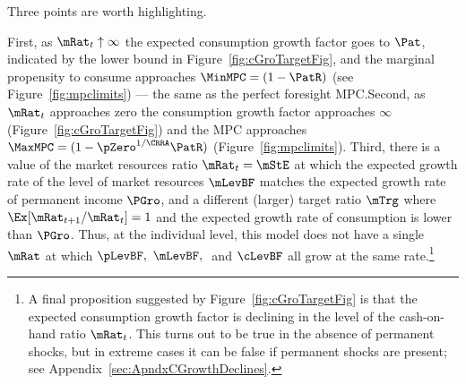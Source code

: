 \documentclass[BufferStockTheory]{subfiles}
\begin{document}
Three points are worth highlighting.  %

First, as $\mRat_{t} \uparrow \infty$ the expected consumption growth factor goes to ${\Pat}$, indicated by the lower bound in Figure~\ref{fig:cGroTargetFig}, and the marginal propensity to consume approaches $\MinMPC=(1-\PatR)$ (see Figure~\ref{fig:mpclimits}) --- the same as the perfect foresight MPC.\@  Second, as $\mRat_{t}$ approaches zero the consumption growth factor approaches $\infty$ (Figure~\ref{fig:cGroTargetFig}) and the MPC approaches $\MaxMPC=(1-\pZero^{1/\CRRA}\PatR)$ (Figure~\ref{fig:mpclimits}).  Third, there is a value of the market resources ratio $\mRat_{t} = \mStE$ at which the expected growth rate of the level of market resources $\mLevBF$ matches the expected growth rate of permanent income $\PGro$, and a different (larger) target ratio $\mTrg$ where $\Ex[\mRat_{t+1}/\mRat_{t}]=1$ and the expected growth rate of consumption is lower than $\PGro$.  Thus, at the individual level, this model does not have a single $\mRat$ at which $\pLevBF,~\mLevBF,~$ and $\cLevBF$ all grow at the same rate.\footnote{A final proposition suggested by Figure~\ref{fig:cGroTargetFig} is that the expected consumption growth factor is declining in the level of the cash-on-hand ratio $\mRat_{t}$.  This turns out to be true in the absence of permanent shocks, but in extreme cases it can be false if permanent shocks are present; see Appendix~\ref{sec:ApndxCGrowthDeclines}.}
\end{document}
